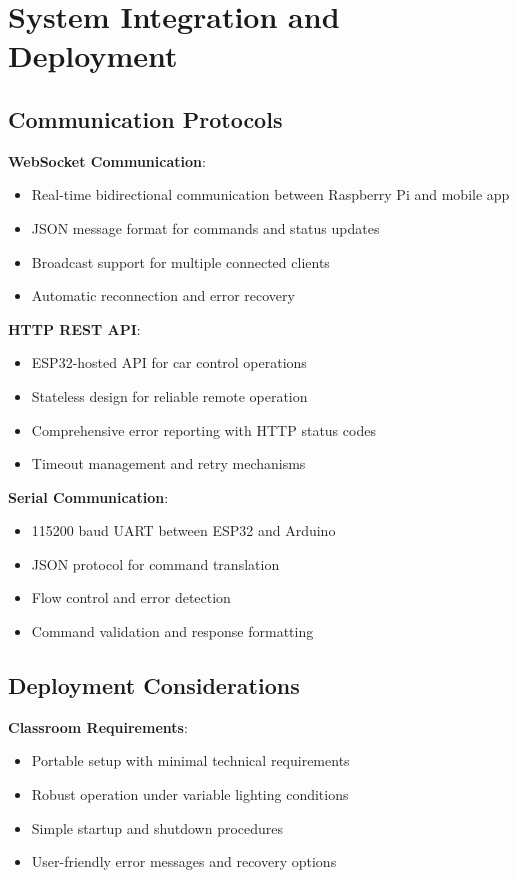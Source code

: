 \section{System Integration and Deployment}

\subsection{Communication Protocols}

\textbf{WebSocket Communication}:
\begin{itemize}
    \item Real-time bidirectional communication between Raspberry Pi and mobile app
    \item JSON message format for commands and status updates
    \item Broadcast support for multiple connected clients
    \item Automatic reconnection and error recovery
\end{itemize}

\textbf{HTTP REST API}:
\begin{itemize}
    \item ESP32-hosted API for car control operations
    \item Stateless design for reliable remote operation
    \item Comprehensive error reporting with HTTP status codes
    \item Timeout management and retry mechanisms
\end{itemize}

\textbf{Serial Communication}:
\begin{itemize}
    \item 115200 baud UART between ESP32 and Arduino
    \item JSON protocol for command translation
    \item Flow control and error detection
    \item Command validation and response formatting
\end{itemize}

\subsection{Deployment Considerations}

\textbf{Classroom Requirements}:
\begin{itemize}
    \item Portable setup with minimal technical requirements
    \item Robust operation under variable lighting conditions
    \item Simple startup and shutdown procedures
    \item User-friendly error messages and recovery options
\end{itemize}

